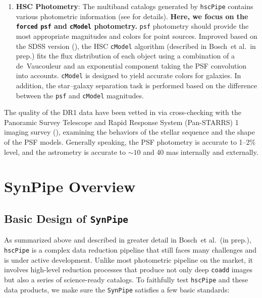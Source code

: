 \documentclass[useamsfonts]{pasj01}
\def\etal{{\ et al.~}}
\def\hscpipe{\texttt{hscPipe}}
\def\synpipe{\texttt{SynPipe}}
\def\cmodel{\texttt{cModel}}
\def\forced{\texttt{forced}}
\begin{document}
\begin{enumerate}
        \item \textbf{HSC Photometry}:
            The multiband catalogs generated by \hscpipe{} contains various photometric
            information (see \citealt{HSCDR1} for details).
            \textbf{Here, we focus on the \forced{} \texttt{psf} and \cmodel{}
            photometry.}
            \texttt{psf} photometry should provide the most appropriate magnitudes and
            colors for point sources.
            Improved based on the SDSS version (\citealt{Lupton2001, Abazajian2004}),
            the HSC \cmodel{}{} algorithm (described in Bosch\etal in prep.) fits the
            flux distribution of each object using a combination of a de~Vaucouleur
            and an exponential component taking the PSF convolution into accounts.
            \cmodel{} is designed to yield accurate colors for galaxies.
            In addition, the star--galaxy separation task is performed based on the
            difference between the \texttt{psf} and \cmodel{}{} magnitudes.

    \end{enumerate}

    The quality of the DR1 data have been vetted in \citet{HSCDR1} via cross-checking
    with the Panoramic Survey Telescope and Rapid Response System (Pan-STARRS) 1
    imaging survey (\citealt{Schlafly2012, Tonry2012, Magnier2013}), examining the
    behaviors of the stellar sequence and the shape of the PSF models.
    Generally speaking, the PSF photometry is accurate to 1--2\% level, and the
    astrometry is accurate to ${\sim}10$ and 40 mas internally and externally.


\section{SynPipe Overview}
    \label{sec:synpipe}

\subsection{Basic Design of \synpipe{}}
    \label{ssec:design}

    As summarized above and described in greater detail in Bosch\etal (in prep.),
    \hscpipe{} is a complex data reduction pipeline that still faces many challenges
    and is under active development.
    Unlike most photometric pipeline on the market, it involves high-level reduction
    processes that produce not only deep \texttt{coadd} images but also a series of
    science-ready catalogs.
    To faithfully test \hscpipe{} and these data products, we make sure the
    \synpipe{} satisfies a few basic standards:
\end{document}
